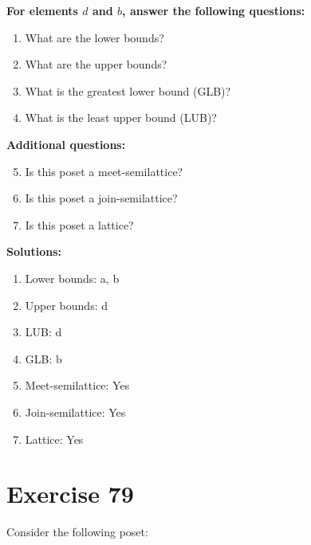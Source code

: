 \documentclass{article}
\begin{document}
    \textbf{For elements $d$ and $b$, answer the following questions:}
\begin{enumerate}
    \item What are the lower bounds?
    \item What are the upper bounds?
    \item What is the greatest lower bound (GLB)?
    \item What is the least upper bound (LUB)?
\end{enumerate}
    \hspace*{3ex} \textbf{Additional questions:}
\begin{enumerate}
    \setcounter{enumi}{4}
    \item Is this poset a meet-semilattice?
    \item Is this poset a join-semilattice?
    \item Is this poset a lattice?
\end{enumerate}

\textbf{Solutions:}
\begin{enumerate}
    \item Lower bounds: {a, b}
    \item Upper bounds: {d}
    \item LUB: d
    \item GLB: b
    \item Meet-semilattice: Yes
    \item Join-semilattice: Yes
    \item Lattice: Yes
\end{enumerate}
\newpage
\section*{Exercise 79}
Consider the following poset:
\begin{center}
\end{center}
\end{document}
